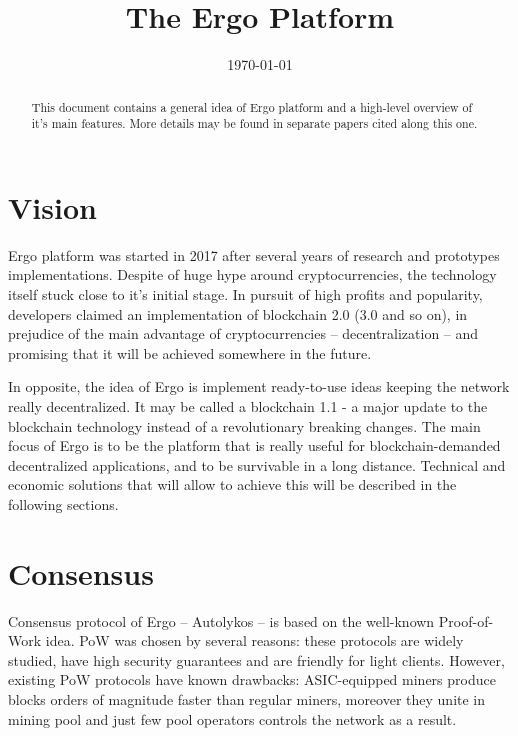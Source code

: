 \documentclass[]{article}
\begin{document}
    \title{The Ergo Platform}

    \date{\today}
    \maketitle

    \begin{abstract}
        This document contains a general idea of Ergo platform and a high-level overview of it's main features.
        More details may be found in separate papers cited along this one.
    \end{abstract}

    \section{Vision}

    Ergo platform was started in 2017 after several years of research and prototypes implementations.
    Despite of huge hype around cryptocurrencies, the technology itself stuck close to it's initial stage.
    In pursuit of high profits and popularity, developers claimed an implementation of blockchain 2.0 (3.0 and so on),
    in prejudice of the main advantage of cryptocurrencies -- decentralization -- and promising that it will be achieved
    somewhere in the future.

    In opposite, the idea of Ergo is implement ready-to-use ideas keeping the network really decentralized.
    It may be called a blockchain 1.1 - a major update to the blockchain technology instead of
    a revolutionary breaking changes.
    The main focus of Ergo is to be the platform that is really useful for blockchain-demanded
    decentralized applications, and to be survivable in a long distance.
    Technical and economic solutions that will allow to achieve this will be described in the following sections.

    \section{Consensus}

    Consensus protocol of Ergo -- Autolykos -- is based on the well-known Proof-of-Work idea.
    PoW was chosen by several reasons: these protocols are widely studied, have high security guarantees
    and are friendly for light clients.
    However, existing PoW protocols have known drawbacks: ASIC-equipped miners produce blocks
    orders of magnitude faster than regular miners, moreover
    they unite in mining pool and just few pool operators controls the network as a result.
\end{document}
